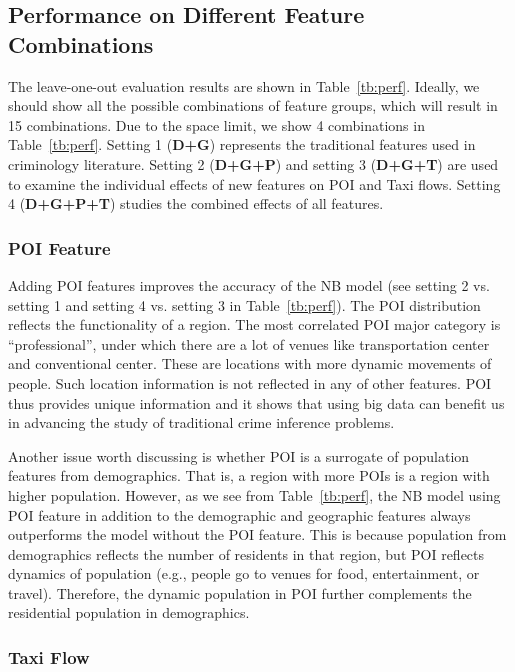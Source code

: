 \subsection{Performance on Different Feature Combinations}

The leave-one-out evaluation results are shown in Table~\ref{tb:perf}. Ideally, we should show all the possible combinations of feature groups, which will result in 15 combinations. Due to the space limit, we show 4 combinations in Table~\ref{tb:perf}. Setting 1 (\textbf{D+G}) represents the traditional features used in criminology literature. Setting 2 (\textbf{D+G+P}) and setting 3 (\textbf{D+G+T}) are used to examine the individual effects of new features on POI and Taxi flows. Setting 4 (\textbf{D+G+P+T}) studies the combined effects of all features.

\subsubsection{POI Feature} 
Adding POI features improves the accuracy of the NB model (see setting 2 vs. setting 1 and setting 4 vs. setting 3 in Table~\ref{tb:perf}). The POI distribution reflects the functionality of a region. The most correlated POI major category is ``professional'', under which there are a lot of venues like transportation center and conventional center. These are locations with more dynamic movements of people. Such location information is not reflected in any of other features. POI thus provides  unique information and it shows that using big data can benefit us in advancing the study of traditional crime inference problems. 

Another issue worth discussing is whether POI is a surrogate of population features from demographics. That is, a region with more POIs is a region with higher population. However, as we see from Table~\ref{tb:perf}, the NB model using POI feature in addition to the demographic and geographic features always outperforms the model without the POI feature. This is because population from demographics reflects the number of residents in that region, but POI reflects dynamics of population (e.g., people go to venues for food, entertainment, or travel). Therefore, the dynamic population in POI further complements the residential population in demographics.


\subsubsection{Taxi Flow} 

